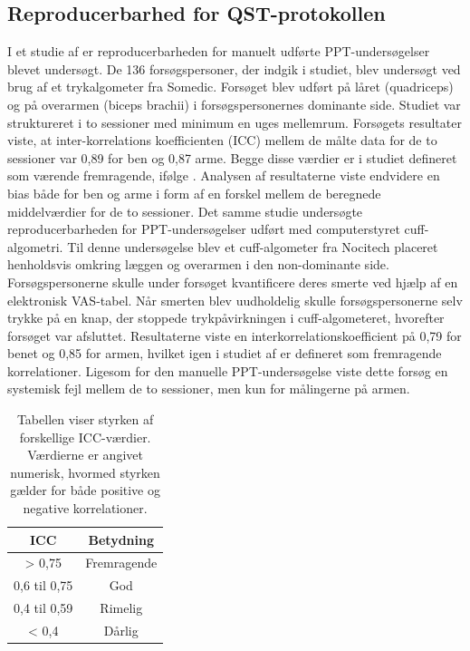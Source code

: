 \subsection{Reproducerbarhed for QST-protokollen}
I et studie af  er reproducerbarheden for manuelt udførte PPT-undersøgelser blevet undersøgt. De 136 forsøgspersoner, der indgik i studiet, blev undersøgt ved brug af et trykalgometer fra Somedic. Forsøget blev udført på låret (quadriceps) og på overarmen (biceps brachii) i forsøgspersonernes dominante side. Studiet var struktureret i to sessioner med minimum en uges mellemrum. Forsøgets resultater viste, at inter-korrelations koefficienten (ICC) mellem de målte data for de to sessioner var 0,89 for ben og 0,87 arme. Begge disse værdier er i studiet defineret som værende fremragende, ifølge . Analysen af resultaterne viste endvidere en bias både for ben og arme i form af en forskel mellem de beregnede middelværdier for de to sessioner. Det samme studie undersøgte reproducerbarheden for PPT-undersøgelser udført med computerstyret cuff-algometri. Til denne undersøgelse blev et cuff-algometer fra Nocitech placeret henholdsvis omkring læggen og overarmen i den non-dominante side. Forsøgspersonerne skulle under forsøget kvantificere deres smerte ved hjælp af en elektronisk VAS-tabel. Når smerten blev uudholdelig skulle forsøgspersonerne selv trykke på en knap, der stoppede trykpåvirkningen i cuff-algometeret, hvorefter forsøget var afsluttet. Resultaterne viste en interkorrelationskoefficient på 0,79 for benet og 0,85 for armen, hvilket igen i studiet af  er defineret som fremragende korrelationer. Ligesom for den manuelle PPT-undersøgelse viste dette forsøg en systemisk fejl mellem de to sessioner, men kun for målingerne på armen.


\begin{table}[H]
	\centering
	\begin{tabular}{cc}
		\rowcolor[HTML]{C0C0C0} 
		ICC  & Betydning  \\ \hline
		> 0,75                  & Fremragende            \\
		0,6 til 0,75            & God                    \\
		0,4 til 0,59            & Rimelig                \\
		< 0,4                   & Dårlig                 \\ \hline
	\end{tabular}
	\caption{Tabellen viser styrken af forskellige ICC-værdier. Værdierne er angivet numerisk, hvormed styrken gælder for både positive og negative korrelationer.}
	\label{tab:styrke_icc}
\end{table}

